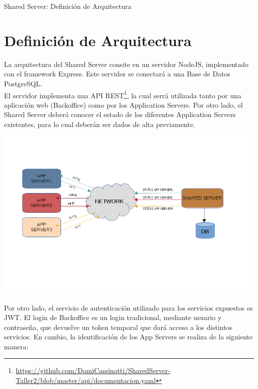 \documentclass[a4paper, 12pt]{article}
\begin{document}
	\begin{titlepage}
		\vspace*{\fill}
		\begin{center}
			\Huge Shared Server: Definición de Arquitectura \\
			\bigskip\bigskip\bigskip
			
		\end{center}
		\vspace*{\fill}
	\end{titlepage}
	\newpage

	\tableofcontents
	\newpage

	\section{Definición de Arquitectura}
	La arquitectura del Shared Server consite en un servidor NodeJS, implementado con el framework Express. Este servidor se conectará a una Base de Datos PostgreSQL.\\
	
	El servidor implementa una API REST\footnote{\url{https://github.com/DamiCassinotti/SharedServer-Taller2/blob/master/api/documentacion.yaml}}, la cual serrá utilizada tanto por una aplicación web (Backoffice) como por los Application Servers. Por otro lado, el Shared Server deberá conocer el estado de los diferentes Application Servers existentes, para lo cual deberán ser dados de alta previamente.
	
	\includegraphics[width=\linewidth]{shared_server.png}
	
	Por otro lado, el servicio de autenticación utilizado para los servicios expuestos es JWT. El login de Backoffice es un login tradicional, mediante usuario y contraseña, que devuelve un token temporal que dará acceso a los distintos servicios. En cambio, la identificación de los App Servers se realiza de la siguiente manera:
	
\end{document}
